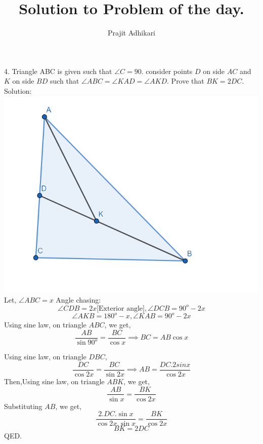 \documentclass{article}
\begin{document}
\title{Solution to Problem of the day.}
\author{Prajit Adhikari}
\maketitle

4. Triangle ABC is given such that $\angle C = 90$. consider points $D$ on side $AC$ and $K$ on side $BD$ such that $\angle ABC = \angle KAD = \angle AKD$. Prove that $BK = 2DC$.\\

Solution:\\

\includegraphics[width=\textwidth]{geo.PNG}
Let, $\angle ABC=x$
Angle chasing:
$$\angle CDB =2x \text{[Exterior angle]}, \angle DCB= 90^o -2x$$
$$\angle AKB = 180^o-x, \angle KAB=90^o-2x$$
Using sine law, on triangle $ABC$, we get,
$$\frac{AB}{\sin{90^o}}=\frac{BC}{\cos{x}} \implies BC=AB \cos{x} $$

Using sine law, on triangle $DBC$,
$$\frac{DC}{\cos{2x}}=\frac{BC}{\sin{2x}} \implies AB= \frac{DC.2sin{x}} {\cos{2x}}$$
Then,Using sine law, on triangle $ABK$, we get,
$$ \frac{AB}{\sin{x}}=\frac{BK}{\cos{2x}}$$
Substituting $AB$, we get,
$$\frac{2.DC.\sin{x}}{\cos{2x}.\sin{x}}=\frac{BK}{\cos{2x}}$$
$$\boxed{BK=2DC}$$
QED.
\end{document}
